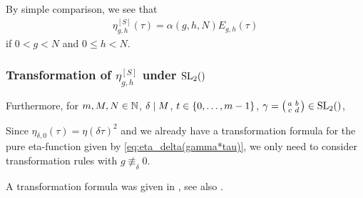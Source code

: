\documentclass{article}
\begin{document}
By simple comparison, we see that
\begin{gather}
  \eta_{g,h}^{[S]}(\tau)
  =
  \alpha(g,h,N) E_{g,h}(\tau)
  \label{eq:eta_g-h-Schoneberg-Yang}
\end{gather}
if $0<g<N$ and $0\le h<N$.







\subsubsection{Transformation of $\eta_{g,h}^{[S]}$ under $\SL2Z$}

Furthermore, for $m, M, N\in\mathbb{N}$, $\delta \mid M$,
$t \in \left\{0,\ldots,m-1\right\}$,
$\gamma=\left(\begin{smallmatrix}a&b\\c&d\end{smallmatrix}\right)\in\SL2Z$,

Since $\eta_{\delta,0}(\tau) = \eta(\delta\tau)^2$ and we already have
a transformation formula for the pure eta-function given by
\eqref{eq:eta_delta(gamma*tau)}, we only need to consider
transformation rules with $g \not\equiv_\delta 0$.

A transformation formula was given in
\cite[Chp.~VIII]{Schoeneberg_EllipticModularFunctions_1974}, see
also \cite[p.~673]{Yang_GeneralizedDedekindEtaFunctions_2004}.
\end{document}
